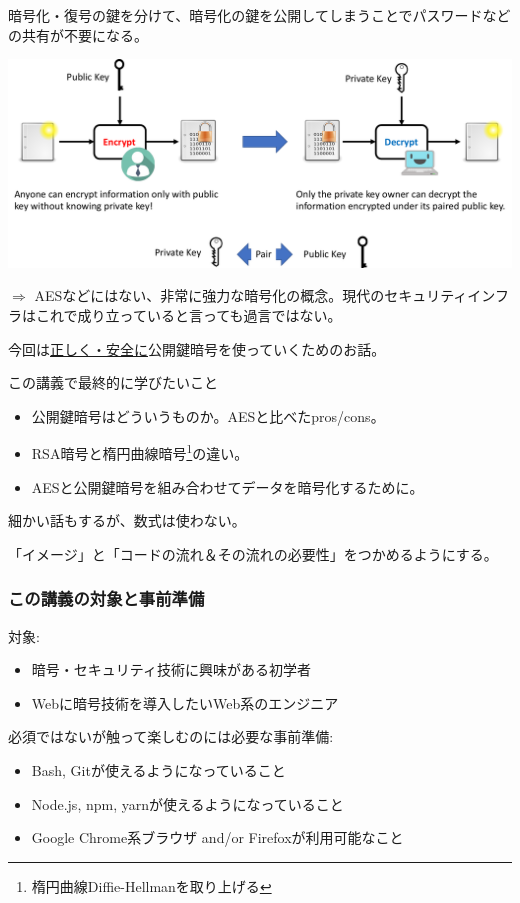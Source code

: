 \documentclass[12pt,dvipdfmx]{beamer}
\begin{document}
\begin{frame}

暗号化・復号の鍵を分けて、暗号化の鍵を公開してしまうことで\alert{パスワードなどの共有が不要}になる。

\begin{center}
\includegraphics[width=\linewidth]{Figs/pk_cryptosystem.pdf}
\end{center}

\vspace{1ex}

$\Rightarrow$ AESなどにはない、非常に強力な暗号化の概念。現代のセキュリティインフラはこれで成り立っていると言っても過言ではない。
\end{frame}

\begin{frame}
今回は\underline{正しく・安全に}公開鍵暗号を使っていくためのお話。

\begin{block}{\small この講義で最終的に学びたいこと}
\begin{itemize}
\item 公開鍵暗号はどういうものか。AESと比べたpros/cons。
\item RSA暗号と楕円曲線暗号\footnote[frame]{楕円曲線Diffie-Hellmanを取り上げる}の違い。
\item AESと公開鍵暗号を組み合わせてデータを暗号化するために。
\end{itemize}
\end{block}

細かい話もするが、数式は使わない。

「イメージ」と「コードの流れ＆その流れの必要性」をつかめるようにする。
\end{frame}


\begin{frame}
\frametitle{この講義の対象と事前準備}
対象:
\begin{itemize}
\item 暗号・セキュリティ技術に興味がある初学者
\item Webに暗号技術を導入したいWeb系のエンジニア
\end{itemize}

\vspace{2ex}

必須ではないが触って楽しむのには必要な事前準備:
\begin{itemize}
\item Bash, Gitが使えるようになっていること
\item Node.js, npm, yarnが使えるようになっていること
\item Google Chrome系ブラウザ and/or Firefoxが利用可能なこと
\end{itemize}
\end{frame}
\end{document}
